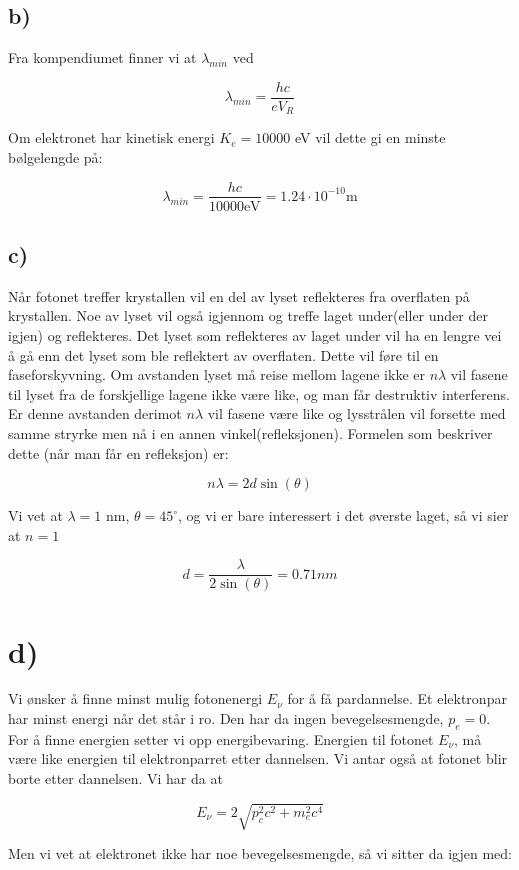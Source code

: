 \documentclass[a4paper,norsk, 10pt]{article}
\begin{document}
\subsection*{b)}
Fra kompendiumet finner vi at $\lambda_{min}$ ved

$$
\lambda_{min}  = \frac{hc}{eV_R}
$$

Om elektronet har kinetisk energi $K_e = 10000$ eV vil dette gi en minste bølgelengde på:

$$
\lambda_{min} =  \frac{hc}{10000 \mathrm{eV}} = 1.24 \cdot 10^{-10} \mathrm{m}
$$

\subsection*{c)}
Når fotonet treffer krystallen vil en del av lyset reflekteres fra overflaten på krystallen. Noe av lyset vil også igjennom og treffe laget under(eller under der igjen) og reflekteres. Det lyset som reflekteres av laget under vil ha en lengre vei å gå enn det lyset som ble reflektert av overflaten. Dette vil føre til en faseforskyvning. Om avstanden lyset må reise mellom lagene ikke er $n\lambda$ vil fasene til lyset fra de forskjellige lagene ikke være like, og man får destruktiv interferens. Er denne avstanden derimot $n\lambda$ vil fasene være like og lysstrålen vil forsette med samme stryrke men nå i en annen vinkel(refleksjonen). Formelen som beskriver dette (når man får en refleksjon) er:

$$
n\lambda = 2d\sin(\theta)
$$

Vi vet at $\lambda = 1$ nm, $\theta = 45^{\circ}$, og vi er bare interessert i det øverste laget, så vi sier at $n = 1$

$$
d = \frac{\lambda}{2\sin(\theta)} = 0.71 nm
$$

\section*{d)}
Vi ønsker å finne minst mulig fotonenergi $E_{\nu}$ for å få pardannelse. Et elektronpar har minst energi når det står i ro. Den har da ingen bevegelsesmengde, $p_e = 0$. For å finne energien setter vi opp energibevaring. Energien til fotonet $E_{\nu}$, må være like energien til elektronparret etter dannelsen. Vi antar også at fotonet blir borte etter dannelsen. Vi har da at

$$
E_{\nu} = 2\sqrt{p_c^2c^2 + m_e^2c^4}
$$

Men vi vet at elektronet ikke har noe bevegelsesmengde, så vi sitter da igjen med:
\end{document}
